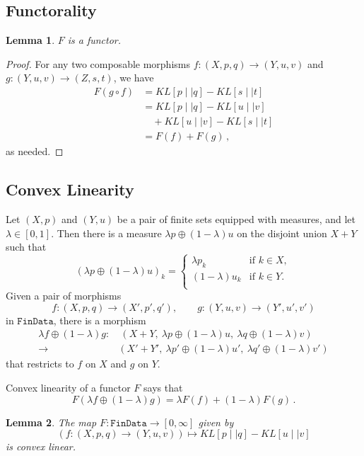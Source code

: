 \documentclass{article}
\newtheorem{lemma}{Lemma}
\begin{document}
\subsection{Functorality}
\begin{lemma}
$F$ is a functor.
\end{lemma}

\begin{proof}
For any two composable morphisms $f:(X, p, q) \rightarrow (Y, u, v)$ and $g:(Y, u, v) \rightarrow (Z, s, t)$, we have 
\begin{align*}
  F(g \circ f) &= KL[p \mid\mid q] - KL[s \mid\mid t]\\
  &= KL[p \mid\mid q] - KL[u \mid\mid v] \\
  &\quad + KL[u \mid\mid v] - KL[s \mid\mid t] \\
  &= F(f) + F(g)\,,
\end{align*}
as needed.
\end{proof}


\subsection{Convex Linearity}
Let $(X, p)$ and $(Y, u)$ be a pair of finite sets equipped with measures, and let $\lambda \in [0,1]$. Then there is a measure $\lambda p \oplus (1-\lambda)u$ on the disjoint union $X + Y$ such that
$$
  (\lambda p \oplus (1-\lambda)u)_k = \begin{cases}
    \lambda p_k &\text{if } k\in X,\\
    (1-\lambda) u_k &\text{if } k\in Y.\\
  \end{cases}
$$
Given a pair of morphisms
$$
f:(X, p, q) \rightarrow (X', p', q'), \qquad g:(Y, u, v) \rightarrow (Y', u', v')
$$
in $\texttt{FinData}$, there is a  morphism
\begin{align*}
\lambda f \oplus (1-\lambda) g:
&\ (X + Y, \ \lambda p \oplus (1-\lambda)u, \ \lambda q \oplus (1-\lambda)v)\\ \rightarrow& (X' + Y', \ \lambda p' \oplus (1-\lambda)u', \ \lambda q' \oplus (1-\lambda)v')
\end{align*}
that restricts to $f$ on $X$ and $g$ on $Y$.

Convex linearity of a functor $F$ says that 
$$F
(\lambda f \oplus (1-\lambda) g) = \lambda F(f) + (1-\lambda) F(g)\,.
$$

\begin{lemma}
The map $F:\texttt{FinData}\rightarrow[0, \infty]$ given by
$$
(f:(X, p, q) \rightarrow (Y, u, v)) \mapsto KL[p \mid\mid q] - KL[u \mid\mid v]
$$
is convex linear.
\end{lemma}
\end{document}

